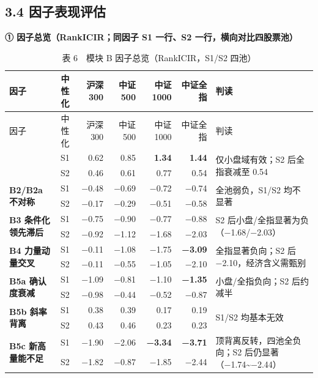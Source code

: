 \documentclass[UTF8,a4paper,zihao=-4,fontset=windows]{ctexart}
\begin{document}
\subsection{3.4
因子表现评估}\label{ux56e0ux5b50ux8868ux73b0ux8bc4ux4f30-1}

\textbf{① 因子总览（RankICIR；同因子 S1 一行、S2
一行，横向对比四股票池）}

\begin{longtable}{@{}p{3.0cm} c r r r r p{5.2cm}@{}}
\caption{表 6　模块 B 因子总览（RankICIR，S1/S2 四池）}\\
\toprule
因子 & 中性化 & 沪深300 & 中证500 & 中证1000 & 中证全指 & 判读 \\
\midrule
\endfirsthead
\toprule
因子 & 中性化 & 沪深300 & 中证500 & 中证1000 & 中证全指 & 判读 \\
\midrule
\endhead
\bottomrule
\endfoot
\multirow{2}{\hsize}{\textbf{B1 领先滞后}} & S1 & 0.62 & 0.85 & \textbf{1.34} & \textbf{1.44} & \multirow{2}{\hsize}{仅小盘域有效；S2 后全指衰减至 0.54} \\
 & S2 & 0.46 & 0.61 & 0.77 & 0.54 & \\
\cmidrule(lr){2-6}
\multirow{2}{\hsize}{\textbf{B2/B2a 不对称}} & S1 & −0.48 & −0.69 & −0.72 & −0.74 & \multirow{2}{\hsize}{全池弱负，S1/S2 均不显著} \\
 & S2 & −0.17 & −0.29 & −0.51 & −0.58 & \\
\cmidrule(lr){2-6}
\multirow{2}{\hsize}{\textbf{B3 条件化领先滞后}} & S1 & −0.75 & −0.90 & −0.77 & −0.88 & \multirow{2}{\hsize}{S2 后小盘/全指显著为负（−1.68/−2.03）} \\
 & S2 & −0.92 & −1.12 & −1.68 & −2.03 & \\
\cmidrule(lr){2-6}
\multirow{2}{\hsize}{\textbf{B4 力量动量交叉}} & S1 & −0.11 & −1.08 & −1.75 & \textbf{−3.09} & \multirow{2}{\hsize}{全指显著负向；S2 后 −2.10，经济含义需甄别} \\
 & S2 & −0.11 & −0.55 & −1.05 & −2.10 & \\
\cmidrule(lr){2-6}
\multirow{2}{\hsize}{\textbf{B5a 确认度衰减}} & S1 & −1.09 & −0.81 & −1.10 & \textbf{−1.35} & \multirow{2}{\hsize}{小盘/全指负向；S2 后约减半} \\
 & S2 & −0.98 & −0.44 & −0.52 & −0.87 & \\
\cmidrule(lr){2-6}
\multirow{2}{\hsize}{\textbf{B5b 斜率背离}} & S1 & 0.38 & 0.39 & 0.17 & 0.19 & \multirow{2}{\hsize}{S1/S2 均基本无效} \\
 & S2 & 0.43 & 0.46 & 0.23 & 0.23 & \\
\cmidrule(lr){2-6}
\multirow{2}{\hsize}{\textbf{B5c 新高量能不足}} & S1 & −1.90 & −2.06 & \textbf{−3.34} & \textbf{−3.71} & \multirow{2}{\hsize}{顶背离反转，四池全负向；S2 后仍显著（−1.74\textasciitilde{}−2.44）} \\
 & S2 & −1.82 & −0.87 & −1.85 & −2.44 & \\
\end{longtable}
\end{document}
